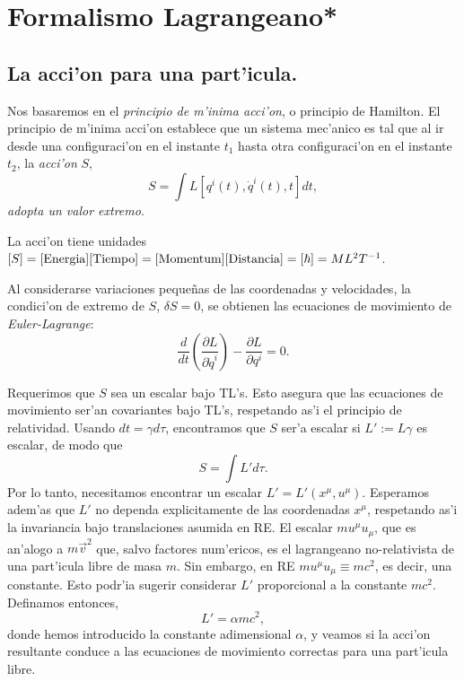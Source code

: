 \section{Formalismo Lagrangeano*}
\subsection{La acci'on para una part'icula.}
Nos basaremos en el \emph{principio de m'inima acci'on}, o
principio de Hamilton. El principio de m'inima acci'on
establece que un sistema mec'anico es tal que al ir desde una
configuraci'on en el instante $t_1$ hasta otra configuraci'on en el instante
$t_2$, la \textit{acci'on} $S$,
\begin{equation}
S=\int L\left[  q^i(t),\dot{q}^i(t)  ,t\right]  dt, \label{Sdt}
\end{equation}
\textit{adopta un valor extremo}.

La acci'on tiene unidades $\left[  S\right]  = {\rm
[Energia][Tiempo]=[Momentum][Distancia]}=[\hbar]=ML^2T^{-1}$.

Al considerarse variaciones peque\~nas de las coordenadas y
velocidades, la condici'on de extremo de $S$, $\delta S=0$, se obtienen las
ecuaciones de movimiento de \textit{Euler-Lagrange}:
\begin{equation}
\frac{d}{dt}\left(  \frac{\partial L}{\partial\dot{q}^i}\right)
-\frac{\partial L}{\partial q^i}=0.\label{L-euler}%
\end{equation}

Requerimos que $S$ sea un escalar bajo TL's. Esto asegura que las ecuaciones de
movimiento ser'an covariantes bajo TL's, respetando as'i el principio de
relatividad. Usando $dt=\gamma d\tau$, encontramos que $S$ ser'a escalar si
$L':=L\gamma$ es escalar, de modo que
\begin{equation}
S=\int L' d\tau.
\end{equation}
Por lo tanto, necesitamos encontrar un escalar $L'=L'(x^\mu,u^\mu)$. Esperamos
adem'as que $L'$ no dependa explicitamente de las coordenadas $x^\mu$,
respetando as'i la invariancia bajo translaciones asumida en RE. El escalar $m u^\mu u_\mu$, que es an'alogo a $m\vec{v}^2$  que, salvo factores
num'ericos, es el lagrangeano no-relativista de una part'icula libre de masa $m$. Sin embargo, en RE $m u^\mu u_\mu\equiv mc^2$, es decir, una constante. Esto podr'ia sugerir considerar $L'$ proporcional a la constante $mc^2$. Definamos entonces,
\begin{equation}
L'=\alpha mc^2,
\end{equation}
donde hemos introducido la constante adimensional $\alpha$, y veamos si la acci'on resultante conduce a las ecuaciones de movimiento correctas para una part'icula libre.

